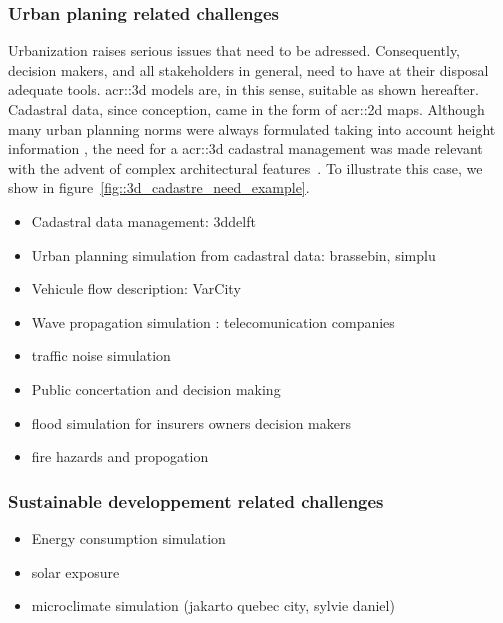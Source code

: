         \subsubsection{Urban planing related challenges}
        Urbanization raises serious issues that need to be adressed.
        Consequently, decision makers, and all stakeholders in general, need to have at their disposal adequate tools.
        \gls{acr::3d} models are, in this sense, suitable as shown hereafter.\\

        Cadastral data, since conception, came in the form of \gls{acr::2d} maps\addref.
        Although many urban planning norms were always formulated taking into account height information \addref, the need for a \gls{acr::3d} cadastral management was made relevant with the advent of complex architectural features~\cite{ijgi4042842}.
        To illustrate this case, we show in figure~\ref{fig::3d_cadastre_need_example}.
        \begin{itemize}
            \item Cadastral data management: 3ddelft
            \item Urban planning simulation from cadastral data: brassebin, simplu
            \item Vehicule flow description: VarCity
            \item Wave propagation simulation : telecomunication companies
            \item traffic noise simulation
            \item Public concertation and decision making
            \item flood simulation for insurers owners decision makers
            \item fire hazards and propogation
        \end{itemize}
        \subsubsection{Sustainable developpement related challenges}
        \begin{itemize}
            \item Energy consumption simulation
            \item solar exposure
            \item microclimate simulation (jakarto quebec city, sylvie daniel)
        \end{itemize}
